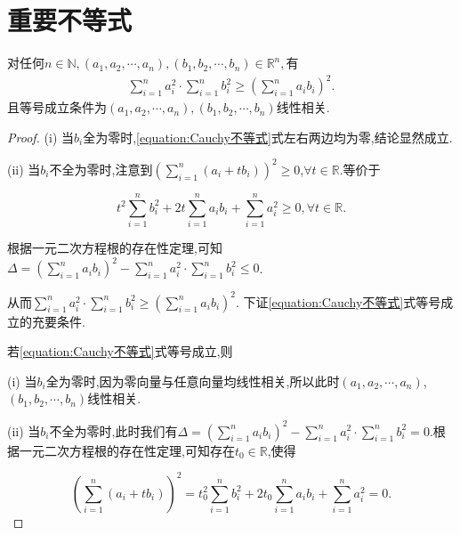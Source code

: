 \documentclass[../../main.tex]{subfiles}%
\begin{document}
\section{重要不等式}

\begin{theorem}\label{theorem:Cauchy不等式(离散版)}
对任何$n\in \mathbb{N} ,\left( a_1,a_2,\cdots ,a_n \right) ,\left( b_1,b_2,\cdots ,b_n \right) \in \mathbb{R} ^n,$有
\begin{align}\label{equation:Cauchy不等式}
\sum\limits_{i=1}^n{a_{i}^{2}\cdot}\sum\limits_{i=1}^n{b_{i}^{2}}\geqslant \left( \sum\limits_{i=1}^n{a_ib_i} \right) ^2.
\end{align}
且等号成立条件为$\left( a_1,a_2,\cdots ,a_n \right) ,\left( b_1,b_2,\cdots ,b_n \right)$线性相关.
\end{theorem}
\begin{proof}
(i) 当\(b_i\)全为零时,\eqref{equation:Cauchy不等式}式左右两边均为零,结论显然成立.

(ii) 当\(b_i\)不全为零时,注意到\(\left(\sum\limits_{i = 1}^{n}(a_i + tb_i)\right)^2 \geqslant 0\),\(\forall t \in \mathbb{R}\).等价于

\[
t^2\sum\limits_{i = 1}^{n}b_{i}^{2} + 2t\sum\limits_{i = 1}^{n}a_ib_i + \sum\limits_{i = 1}^{n}a_{i}^{2} \geqslant 0,  \forall t \in \mathbb{R}.
\]

根据一元二次方程根的存在性定理,可知\(\Delta = \left(\sum\limits_{i = 1}^{n}a_ib_i\right)^2 - \sum\limits_{i = 1}^{n}a_{i}^{2} \cdot \sum\limits_{i = 1}^{n}b_{i}^{2} \leqslant 0\).

从而\(\sum\limits_{i = 1}^{n}a_{i}^{2} \cdot \sum\limits_{i = 1}^{n}b_{i}^{2} \geqslant \left(\sum\limits_{i = 1}^{n}a_ib_i\right)^2\).
下证\eqref{equation:Cauchy不等式}式等号成立的充要条件.

若\eqref{equation:Cauchy不等式}式等号成立,则

(i) 当\(b_i\)全为零时,因为零向量与任意向量均线性相关,所以此时\((a_1,a_2,\cdots,a_n)\),\((b_1,b_2,\cdots,b_n)\)线性相关.

(ii) 当\(b_i\)不全为零时,此时我们有\(\Delta = \left(\sum\limits_{i = 1}^{n}a_ib_i\right)^2 - \sum\limits_{i = 1}^{n}a_{i}^{2} \cdot \sum\limits_{i = 1}^{n}b_{i}^{2} = 0\).根据一元二次方程根的存在性定理,可知存在\(t_0 \in \mathbb{R}\),使得

\[
\left(\sum\limits_{i = 1}^{n}(a_i + tb_i)\right)^2 = t_{0}^{2}\sum\limits_{i = 1}^{n}b_{i}^{2} + 2t_0\sum\limits_{i = 1}^{n}a_ib_i + \sum\limits_{i = 1}^{n}a_{i}^{2} = 0.
\]


\end{proof}
\end{document}
